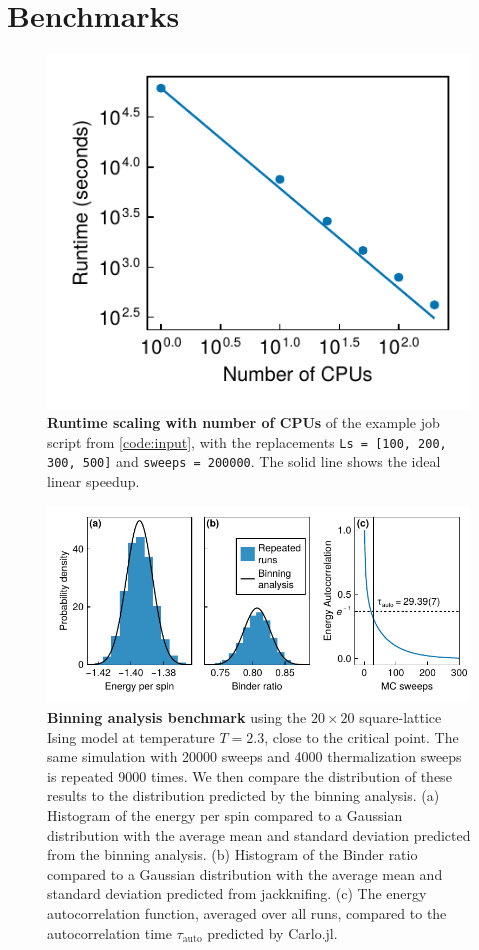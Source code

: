 \documentclass{SciPost}
\begin{document}
\section{Benchmarks}
\label{sec:benchmarks}
\begin{figure}
\begin{center}
\includegraphics{figs/scaling.pdf}
\end{center}
\caption{\textbf{Runtime scaling with number of CPUs} of the example job script from \cref{code:input}, with the replacements \texttt{Ls = [100, 200, 300, 500]} and \texttt{sweeps = 200000}. The solid line shows the ideal linear speedup.}
\label{fig:benchmark}
\end{figure}
\begin{figure}
\begin{center}
\includegraphics{figs/stats.pdf}
\end{center}
\caption{\textbf{Binning analysis benchmark} using the $20\times 20$ square-lattice Ising model at temperature $T=2.3$, close to the critical point. The same simulation with 20000 sweeps and 4000 thermalization sweeps is repeated 9000 times. We then compare the distribution of these results to the distribution predicted by the binning analysis. (a) Histogram of the energy per spin compared to a Gaussian distribution with the average mean and standard deviation predicted from the binning analysis. (b) Histogram of the Binder ratio compared to a Gaussian distribution with the average mean and standard deviation predicted from jackknifing. (c) The energy autocorrelation function, averaged over all runs, compared to the autocorrelation time $\tau_\text{auto}$ predicted by Carlo.jl.}
\label{fig:statistics}
\end{figure}
\end{document}
